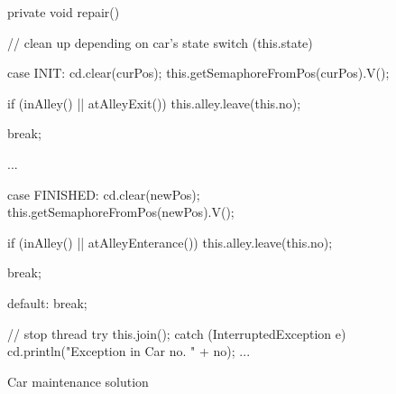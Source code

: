 
\begin{figure}[H]
  \begin{java}
private void repair() {
    // clean up depending on car's state
    switch (this.state) {
        case INIT:
            cd.clear(curPos);
            this.getSemaphoreFromPos(curPos).V();

            if (inAlley() || atAlleyExit())
                this.alley.leave(this.no);

            break;

        ...

        case FINISHED:
            cd.clear(newPos);
            this.getSemaphoreFromPos(newPos).V();

            if (inAlley() || atAlleyEnterance())
                this.alley.leave(this.no);

            break;

        default:
            break;
    }

    // stop thread
    try {
        this.join();
    } catch (InterruptedException e) {
        cd.println("Exception in Car no. " + no);
        ...
    }
}
  \end{java}
  \caption{Car maintenance solution}
\label{lst:main-rep}  
\end{figure}

